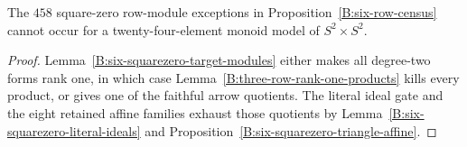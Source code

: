 \begin{corollary}\label{B:six-squarezero-product-exclusion}
The $458$ square-zero row-module exceptions in
Proposition~\ref{B:six-row-census} cannot occur for a
twenty-four-element monoid model of $S^2\times S^2$.
\end{corollary}
\begin{proof}
Lemma~\ref{B:six-squarezero-target-modules} either makes all
degree-two forms rank one, in which case
Lemma~\ref{B:three-row-rank-one-products} kills every product,
or gives one of the faithful arrow quotients.  The literal ideal
gate and the eight retained affine families exhaust those
quotients by Lemma~\ref{B:six-squarezero-literal-ideals} and
Proposition~\ref{B:six-squarezero-triangle-affine}.
\end{proof}
